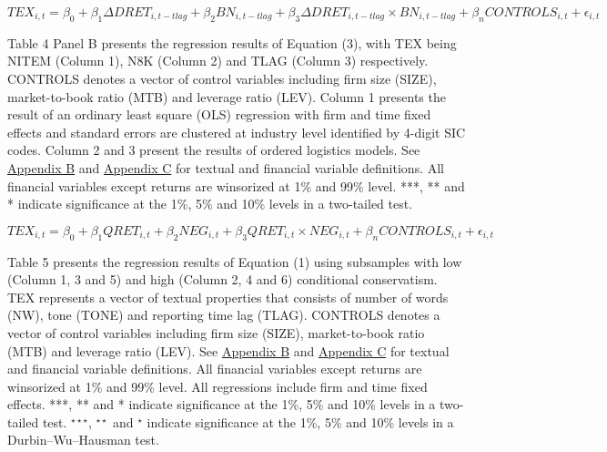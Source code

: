\newpage

\setcounter{equation}{2}
\begin{equation}
TEX_{i,t}=\beta_0+\beta_1\Delta DRET_{i,t-tlag}+\beta_2BN_{i,t-tlag}+\beta_3\Delta DRET_{i,t-tlag}\times BN_{i,t-tlag}+\beta_nCONTROLS_{i,t}+\epsilon_{i,t}
\end{equation}

Table 4 Panel B presents the regression results of Equation (3), with TEX being NITEM (Column 1), N8K (Column 2) and TLAG (Column 3) respectively. CONTROLS denotes a vector of control variables including firm size (SIZE), market-to-book ratio (MTB) and leverage ratio (LEV). Column 1 presents the result of an ordinary least square (OLS) regression with firm and time fixed effects and standard errors are clustered at industry level identified by 4-digit SIC codes. Column 2 and 3 present the results of ordered logistics models. See \hyperref[appb]{Appendix B} and \hyperref[appc]{Appendix C} for textual and financial variable definitions. All financial variables except returns are winsorized at 1\% and 99\% level. ***, ** and * indicate significance at the 1\%, 5\% and 10\% levels in a two-tailed test.

\newpage

\setcounter{equation}{0}
\begin{equation}
TEX_{i,t}=\beta_0+\beta_1QRET_{i,t}+\beta_2NEG_{i,t}+\beta_3QRET_{i,t}\times NEG_{i,t}+\beta_nCONTROLS_{i,t}+\epsilon_{i,t}
\end{equation}

Table 5 presents the regression results of Equation (1) using subsamples with low (Column 1, 3 and 5) and high (Column 2, 4 and 6) conditional conservatism. TEX represents a vector of textual properties that consists of number of words (NW), tone (TONE) and reporting time lag (TLAG). CONTROLS denotes a vector of control variables including firm size (SIZE), market-to-book ratio (MTB) and leverage ratio (LEV). See \hyperref[appb]{Appendix B} and \hyperref[appc]{Appendix C} for textual and financial variable definitions. All financial variables except returns are winsorized at 1\% and 99\% level. All regressions include firm and time fixed effects. ***, ** and * indicate significance at the 1\%, 5\% and 10\% levels in a two-tailed test. $^{\star\star\star}$, $^{\star\star}$ and $^{\star}$ indicate significance at the 1\%, 5\% and 10\% levels in a Durbin–Wu–Hausman test.

